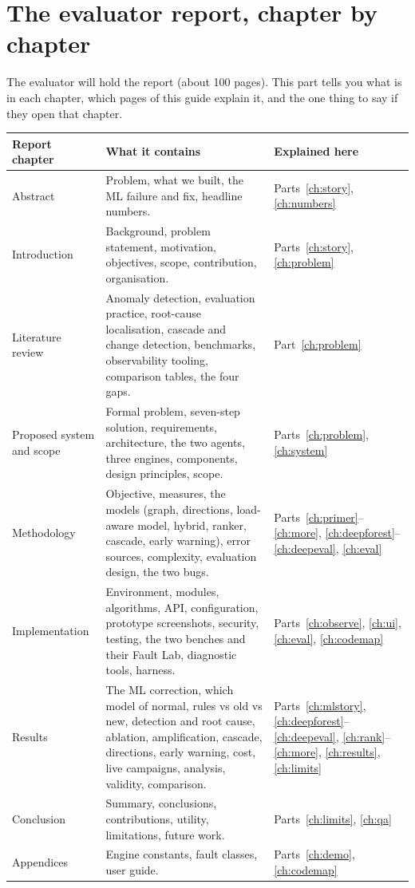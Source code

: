 \chapter{The evaluator report, chapter by chapter}
\label{ch:reportmap}

The evaluator will hold the report (about 100 pages). This part tells you what is in each chapter, which pages of this guide explain it, and the one thing to say if they open that chapter.

\begin{center}
\small
\begin{tabularx}{\textwidth}{>{\raggedright\arraybackslash}p{3.1cm}>{\raggedright\arraybackslash}X>{\raggedright\arraybackslash}p{3.2cm}}
\toprule
\textbf{Report chapter} & \textbf{What it contains} & \textbf{Explained here}\\
\midrule
Abstract & Problem, what we built, the ML failure and fix, headline numbers. & Parts~\ref{ch:story}, \ref{ch:numbers}\\
1 Introduction & Background, problem statement, motivation, objectives, scope, contribution, organisation. & Parts~\ref{ch:story}, \ref{ch:problem}\\
2 Literature review & Anomaly detection, evaluation practice, root-cause localisation, cascade and change detection, benchmarks, observability tooling, comparison tables, the four gaps. & Part~\ref{ch:problem}\\
3 Proposed system and scope & Formal problem, seven-step solution, requirements, architecture, the two agents, three engines, components, design principles, scope. & Parts~\ref{ch:problem}, \ref{ch:system}\\
4 Methodology & Objective, measures, the models (graph, directions, load-aware model, hybrid, ranker, cascade, early warning), error sources, complexity, evaluation design, the two bugs. & Parts~\ref{ch:primer}--\ref{ch:more}, \ref{ch:deepforest}--\ref{ch:deepeval}, \ref{ch:eval}\\
5 Implementation & Environment, modules, algorithms, API, configuration, prototype screenshots, security, testing, the two benches and their Fault Lab, diagnostic tools, harness. & Parts~\ref{ch:observe}, \ref{ch:ui}, \ref{ch:eval}, \ref{ch:codemap}\\
6 Results & The ML correction, which model of normal, rules vs old vs new, detection and root cause, ablation, amplification, cascade, directions, early warning, cost, live campaigns, analysis, validity, comparison. & Parts~\ref{ch:mlstory}, \ref{ch:deepforest}--\ref{ch:deepeval}, \ref{ch:rank}--\ref{ch:more}, \ref{ch:results}, \ref{ch:limits}\\
7 Conclusion & Summary, conclusions, contributions, utility, limitations, future work. & Parts~\ref{ch:limits}, \ref{ch:qa}\\
Appendices & Engine constants, fault classes, user guide. & Parts~\ref{ch:demo}, \ref{ch:codemap}\\
\bottomrule
\end{tabularx}
\end{center}

